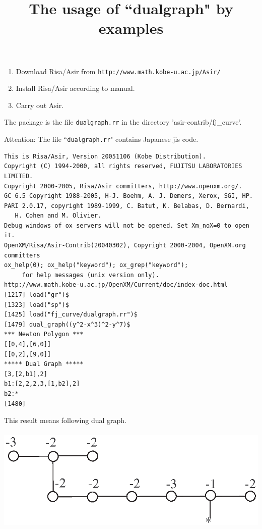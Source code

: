 \documentclass[a4paper,12pt]{article}
\title{The usage of ``dualgraph" by examples}
\begin{document}
\maketitle

\begin{enumerate}
\item Download Risa/Asir from {\tt http://www.math.kobe-u.ac.jp/Asir/}\\
\item Install Risa/Asir according to manual.\\
\item Carry out Asir.
\end{enumerate}

The package is the file {\tt dualgraph.rr} in the directory 'asir-contrib/fj\_curve'.

Attention: The file ``{\tt dualgraph.rr}" contains Japanese jis code.

\begin{verbatim}
This is Risa/Asir, Version 20051106 (Kobe Distribution).
Copyright (C) 1994-2000, all rights reserved, FUJITSU LABORATORIES LIMITED.
Copyright 2000-2005, Risa/Asir committers, http://www.openxm.org/.
GC 6.5 Copyright 1988-2005, H-J. Boehm, A. J. Demers, Xerox, SGI, HP.
PARI 2.0.17, copyright 1989-1999, C. Batut, K. Belabas, D. Bernardi,
   H. Cohen and M. Olivier.
Debug windows of ox servers will not be opened. Set Xm_noX=0 to open it.
OpenXM/Risa/Asir-Contrib(20040302), Copyright 2000-2004, OpenXM.org committers
ox_help(0); ox_help("keyword"); ox_grep("keyword");
     for help messages (unix version only).
http://www.math.kobe-u.ac.jp/OpenXM/Current/doc/index-doc.html
[1217] load("gr")$
[1323] load("sp")$
[1425] load("fj_curve/dualgraph.rr")$
[1479] dual_graph((y^2-x^3)^2-y^7)$
*** Newton Polygon ***
[[0,4],[6,0]]
[[0,2],[9,0]]
***** Dual Graph *****
[3,[2,b1],2]
b1:[2,2,2,3,[1,b2],2]
b2:*
[1480]
\end{verbatim}

This result means following dual graph.

 \psfrag{*}{$*$}
 \centerline{
  \includegraphics*[height=5cm]{g-dual1.eps}
 }
\end{document}
